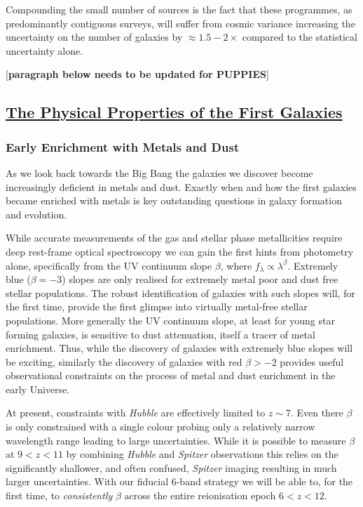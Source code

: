 \documentclass[12pt]{article}
\begin{document}
Compounding the small number of sources is the fact that these programmes, as predominantly contiguous surveys, will suffer from cosmic variance increasing the uncertainty on the number of galaxies by $\approx 1.5-2\times$ compared to the statistical uncertainty alone\cite{2020MNRAS.499.2401T}\cite{2020MNRAS.496..754B}\cite{2008ApJ...676..767T}. 

[{\bf paragraph below needs to be updated for PUPPIES}]



\subsection*{\bf \underline{The Physical Properties of the First Galaxies}}

\subsubsection*{\bf Early Enrichment with Metals and Dust}\label{sec:properties}

As we look back towards the Big Bang the galaxies we discover become increasingly deficient in metals and dust. Exactly when and how the first galaxies became enriched with metals is key outstanding questions in galaxy formation and evolution.

While accurate measurements of the gas and stellar phase metallicities require deep rest-frame optical spectroscopy we can gain the first hints from photometry alone, specifically from the UV continuum slope $\beta$,  where $f_{\lambda}\propto\lambda^{\beta}$. Extremely blue ($\beta = -3$) slopes are only realised for extremely metal poor and dust free stellar populations. The robust identification of galaxies with such slopes will, for the first time, provide the first glimpse into virtually metal-free stellar populations. More generally the UV continuum slope, at least for young star forming galaxies, is sensitive to dust attenuation, itself a tracer of metal enrichment. Thus, while the discovery of galaxies with extremely blue slopes will be exciting, similarly the discovery of galaxies with red $\beta > -2$ provides useful observational constraints on the process of metal and dust enrichment in the early Universe. 

At present, constraints with \emph{Hubble} are effectively limited to $z\sim 7$. Even there $\beta$ is only constrained with a single colour probing only a relatively narrow wavelength range leading to large uncertainties. While it is possible to measure $\beta$ at $9<z<11$ by combining {\em Hubble} and {\em Spitzer} observations \citep[e.g][]{2016MNRAS.455..659W} this relies on the significantly shallower, and often confused, {\em Spitzer} imaging resulting in much larger uncertainties. With our fiducial 6-band strategy we will be able to, for the first time, to \emph{consistently} $\beta$ across the entire reionisation epoch $6<z<12$.
\end{document}
